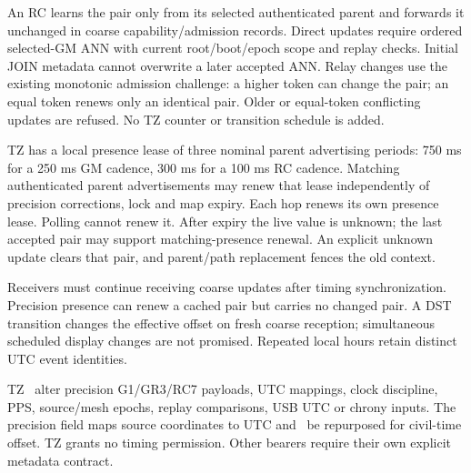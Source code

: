 \documentclass[11pt,letterpaper]{article}
\begin{document}
An RC learns the pair only from its selected authenticated parent and forwards it unchanged in coarse capability/admission records. Direct updates require ordered selected-GM ANN with current root/boot/epoch scope and replay checks. Initial JOIN metadata cannot overwrite a later accepted ANN. Relay changes use the existing monotonic admission challenge: a higher token can change the pair; an equal token renews only an identical pair. Older or equal-token conflicting updates are refused. No TZ counter or transition schedule is added.

TZ has a local presence lease of three nominal parent advertising periods: 750 ms for a 250 ms GM cadence, 300 ms for a 100 ms RC cadence. Matching authenticated parent advertisements may renew that lease independently of precision corrections, lock and map expiry. Each hop renews its own presence lease. Polling cannot renew it. After expiry the live value is unknown; the last accepted pair may support matching-presence renewal. An explicit unknown update clears that pair, and parent/path replacement fences the old context.

Receivers must continue receiving coarse updates after timing synchronization. Precision presence can renew a cached pair but carries no changed pair. A DST transition changes the effective offset on fresh coarse reception; simultaneous scheduled display changes are not promised. Repeated local hours retain distinct UTC event identities.

TZ \mustnot\ alter precision G1/GR3/RC7 payloads, UTC mappings, clock discipline, PPS, source/mesh epochs, replay comparisons, USB UTC or chrony inputs. The precision field  maps source coordinates to UTC and \mustnot\ be repurposed for civil-time offset. TZ grants no timing permission. Other bearers require their own explicit metadata contract.

\page
\end{document}
